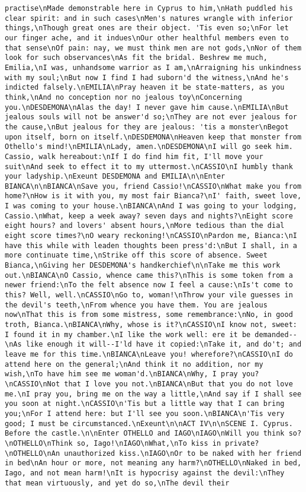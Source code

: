\begin{verbatim}
practise\nMade demonstrable here in Cyprus to him,\nHath puddled his clear spirit: and in such cases\nMen's natures wrangle with inferior things,\nThough great ones are their object. 'Tis even so;\nFor let our finger ache, and it indues\nOur other healthful members even to that sense\nOf pain: nay, we must think men are not gods,\nNor of them look for such observances\nAs fit the bridal. Beshrew me much, Emilia,\nI was, unhandsome warrior as I am,\nArraigning his unkindness with my soul;\nBut now I find I had suborn'd the witness,\nAnd he's indicted falsely.\nEMILIA\nPray heaven it be state-matters, as you think,\nAnd no conception nor no jealous toy\nConcerning you.\nDESDEMONA\nAlas the day! I never gave him cause.\nEMILIA\nBut jealous souls will not be answer'd so;\nThey are not ever jealous for the cause,\nBut jealous for they are jealous: 'tis a monster\nBegot upon itself, born on itself.\nDESDEMONA\nHeaven keep that monster from Othello's mind!\nEMILIA\nLady, amen.\nDESDEMONA\nI will go seek him. Cassio, walk hereabout:\nIf I do find him fit, I'll move your suit\nAnd seek to effect it to my uttermost.\nCASSIO\nI humbly thank your ladyship.\nExeunt DESDEMONA and EMILIA\n\nEnter BIANCA\n\nBIANCA\nSave you, friend Cassio!\nCASSIO\nWhat make you from home?\nHow is it with you, my most fair Bianca?\nI' faith, sweet love, I was coming to your house.\nBIANCA\nAnd I was going to your lodging, Cassio.\nWhat, keep a week away? seven days and nights?\nEight score eight hours? and lovers' absent hours,\nMore tedious than the dial eight score times?\nO weary reckoning!\nCASSIO\nPardon me, Bianca:\nI have this while with leaden thoughts been press'd:\nBut I shall, in a more continuate time,\nStrike off this score of absence. Sweet Bianca,\nGiving her DESDEMONA's handkerchief\n\nTake me this work out.\nBIANCA\nO Cassio, whence came this?\nThis is some token from a newer friend:\nTo the felt absence now I feel a cause:\nIs't come to this? Well, well.\nCASSIO\nGo to, woman!\nThrow your vile guesses in the devil's teeth,\nFrom whence you have them. You are jealous now\nThat this is from some mistress, some remembrance:\nNo, in good troth, Bianca.\nBIANCA\nWhy, whose is it?\nCASSIO\nI know not, sweet: I found it in my chamber.\nI like the work well: ere it be demanded--\nAs like enough it will--I'ld have it copied:\nTake it, and do't; and leave me for this time.\nBIANCA\nLeave you! wherefore?\nCASSIO\nI do attend here on the general;\nAnd think it no addition, nor my wish,\nTo have him see me woman'd.\nBIANCA\nWhy, I pray you?\nCASSIO\nNot that I love you not.\nBIANCA\nBut that you do not love me.\nI pray you, bring me on the way a little,\nAnd say if I shall see you soon at night.\nCASSIO\n'Tis but a little way that I can bring you;\nFor I attend here: but I'll see you soon.\nBIANCA\n'Tis very good; I must be circumstanced.\nExeunt\n\nACT IV\n\nSCENE I. Cyprus. Before the castle.\n\nEnter OTHELLO and IAGO\nIAGO\nWill you think so?\nOTHELLO\nThink so, Iago!\nIAGO\nWhat,\nTo kiss in private?\nOTHELLO\nAn unauthorized kiss.\nIAGO\nOr to be naked with her friend in bed\nAn hour or more, not meaning any harm?\nOTHELLO\nNaked in bed, Iago, and not mean harm!\nIt is hypocrisy against the devil:\nThey that mean virtuously, and yet do so,\nThe devil their 
\end{verbatim}
